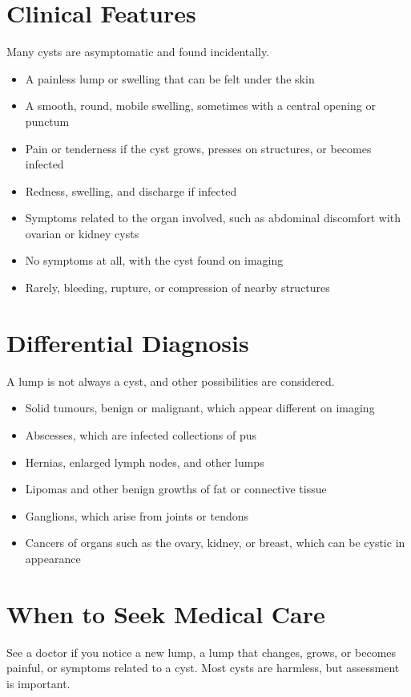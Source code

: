 \section*{Clinical Features}
Many cysts are asymptomatic and found incidentally.

\begin{itemize}
    \item A painless lump or swelling that can be felt under the skin
    \item A smooth, round, mobile swelling, sometimes with a central opening or punctum
    \item Pain or tenderness if the cyst grows, presses on structures, or becomes infected
    \item Redness, swelling, and discharge if infected
    \item Symptoms related to the organ involved, such as abdominal discomfort with ovarian or kidney cysts
    \item No symptoms at all, with the cyst found on imaging
    \item Rarely, bleeding, rupture, or compression of nearby structures
\end{itemize}

\section*{Differential Diagnosis}
A lump is not always a cyst, and other possibilities are considered.

\begin{itemize}
    \item Solid tumours, benign or malignant, which appear different on imaging
    \item Abscesses, which are infected collections of pus
    \item Hernias, enlarged lymph nodes, and other lumps
    \item Lipomas and other benign growths of fat or connective tissue
    \item Ganglions, which arise from joints or tendons
    \item Cancers of organs such as the ovary, kidney, or breast, which can be cystic in appearance
\end{itemize}

\section*{When to Seek Medical Care}
See a doctor if you notice a new lump, a lump that changes, grows, or becomes painful, or symptoms related to a cyst. Most cysts are harmless, but assessment is important.

